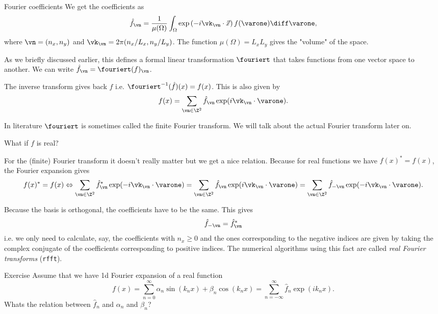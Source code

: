 \begin{frame}{Fourier coefficients}
	We get the coefficients as
	\begin{equation}\label{eq:fourier_transform}
		\hat{f}_\vn = \frac{1}{\mu(\Omega)}\int_{\Omega}  \exp \left( - i \vk_\vn \cdot \vec{x} \right) f(\varone) \diff \varone,
	\end{equation}
	where $ \vn = (n_x,n_y) $ and $ \vk_{\vn} = 2\pi (n_x/L_x,n_y/L_y) $. The function $ \mu(\Omega) = L_x L_y $
	gives the "volume" of the space. 
	
	\pause
	As we briefly discussed earlier, this defines a formal linear transformation $ \fouriert $ that takes functions from one vector space to another. We can write $ \hat{f}_\vn = \fouriert(f)_\vn $.
	
	\pause
	The inverse transform gives back $ f $ i.e. $ \fouriert^{-1} (\hat{f}) (x) = f(x) $. This is also given by 
	\[  
	f(x) = \sum_{\vn\in \Z^2} \hat{f}_\vn \exp(i \vk_{\vn} \cdot \varone).
	\]
	
	In literature $ \fouriert $ is sometimes called the \alert{finite Fourier transform}. We will talk about the actual Fourier transform later on.
\end{frame}

\begin{frame}
	What if $ f $ is real?
	
	\pause
	For the (finite) Fourier transform it doesn't really matter but we get a nice relation. Because for real functions we have $ f(x)^* = f(x) $, the Fourier expansion gives 
	\[  f(x)^* = f(x) \Leftrightarrow
	\sum_{\vn\in \Z^2} \hat{f}_\vn^* \exp(-i \vk_{\vn} \cdot \varone)
	= \sum_{\vn\in \Z^2} \hat{f}_\vn \exp(i \vk_{\vn} \cdot \varone)
	= \sum_{\vn\in \Z^2} \hat{f}_{-\vn} \exp(-i \vk_{\vn} \cdot \varone).
	\]
	
	\pause
	Because the basis is orthogonal, the coefficients have to be the same. This gives
	\[  
	\hat{f}_{-\vn} = \hat{f}^*_{\vn}
	\]
	i.e. we only need to calculate, say, the coefficients with $ n_x \geq 0 $ and the ones corresponding to the negative indices are given by taking the complex conjugate of the coefficients corresponding to positive indices. The numerical algorithms using this fact are called \emph{real Fourier transforms} (\texttt{rfft}).  
	
\end{frame}

\begin{frame}{Exercise \exercisen}
	Assume that we have 1d Fourier expansion of a real function  
	\[  
	f(x) = \sum_{n=0}^{\infty} \alpha_{n} \sin(k_n x) + \beta_n \cos(k_n x) 
	=  \sum_{n=-\infty}^{\infty} \hat{f}_n \exp(i k_n x).
	\] 
	Whats the relation between $ \hat{f}_n $ and $\alpha_n$ and $\beta_n$?
\end{frame}


